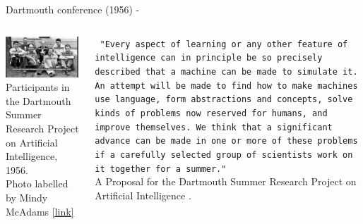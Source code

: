 %
%
%

\begin{frame}[t,allowframebreaks]{Dartmouth conference (1956) -} 

    \vspace{-0.2cm}

    \begin{columns}
        \begin{column}{0.62\textwidth}
            \begin{center}
            \includegraphics[width=0.98\textwidth]{./images/people/dartmouth_1956.jpg}\\
            { \scriptsize 
            \vspace{0.1cm}
            Participants in the Dartmouth Summer Research Project 
            on Artificial Intelligence, 1956.\\
            \color{col:attribution} 
            Photo labelled by Mindy McAdams
            \href{https://twitter.com/macloo/status/1319683530742431748/photo/1}{\tiny [link]}
            \\}
            \end{center}
        \end{column}
        \begin{column}{0.38\textwidth}
            \begin{blockexample}{} 
            {\tt 
                \scriptsize
                "Every aspect of learning or any other 
                feature of intelligence can in principle 
                be so precisely described that a machine can be made 
                to simulate it. An attempt will be made to find how 
                to make machines use language, form abstractions and 
                concepts, solve kinds of problems now reserved for humans, 
                and improve themselves. We think that a significant advance 
                can be made in one or more of these problems if a carefully 
                selected group of scientists work on it together for a summer."\\
            } 
           \vspace{0.2cm}
            {\scriptsize
                 A Proposal for the Dartmouth Summer Research Project 
                 on Artificial Intelligence \cite{Dartmouth:1956}.\\
            }
            \end{blockexample}
        \end{column}
    \end{columns}


\end{frame}
